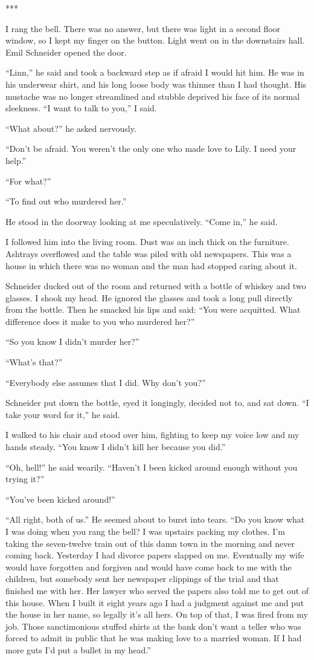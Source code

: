 \documentclass{novel}
\begin{document}
{***

I rang the bell. There was no answer, but there was light in a second floor window, so I kept my finger on the button. Light went on in the downstairs hall. Emil Schneider opened the door.

“Linn,” he said and took a backward step as if afraid I would hit him. He was in his underwear shirt, and his long loose body was thinner than I had thought. His mustache was no longer streamlined and stubble deprived his face of its normal sleekness. “I want to talk to you,” I said.

“What about?” he asked nervously.

“Don’t be afraid. You weren’t the only one who made love to Lily. I need your help.”

“For what?”

“To find out who murdered her.”

He stood in the doorway looking at me speculatively. “Come in,” he said.

I followed him into the living room. Dust was an inch thick on the furniture. Ashtrays overflowed and the table was piled with old newspapers. This was a house in which there was no woman and the man had stopped caring about it.

Schneider ducked out of the room and returned with a bottle of whiskey and two glasses. I shook my head. He ignored the glasses and took a long pull directly from the bottle. Then he smacked his lips and said: “You were acquitted. What difference does it make to you who murdered her?”

“So you know I didn’t murder her?”

“What’s that?”

“Everybody else assumes that I did. Why don’t you?”

Schneider put down the bottle, eyed it longingly, decided not to, and sat down. “I take your word for it,” he said.

I walked to his chair and stood over him, fighting to keep my voice low and my hands steady. “You know I didn’t kill her because you did.”

“Oh, hell!” he said wearily. “Haven’t I been kicked around enough without you trying it?”

“You’ve been kicked around!”

“All right, both of us.” He seemed about to burst into tears. “Do you know what I was doing when you rang the bell? I was upstairs packing my clothes. I’m taking the seven-twelve train out of this damn town in the morning and never coming back. Yesterday I had divorce papers slapped on me. Eventually my wife would have forgotten and forgiven and would have come back to me with the children, but somebody sent her newspaper clippings of the trial and that finished me with her. Her lawyer who served the papers also told me to get out of this house. When I built it eight years ago I had a judgment against me and put the house in her name, so legally it’s all hers. On top of that, I was fired from my job. Those sanctimonious stuffed shirts at the bank don’t want a teller who was forced to admit in public that he was making love to a married woman. If I had more guts I’d put a bullet in my head.”

}
\end{document}
